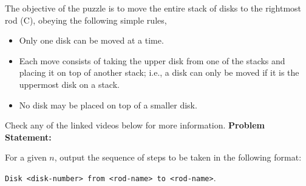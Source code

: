 The objective of the puzzle is to move the entire stack of disks to the
rightmost rod (C), obeying the following simple rules,
\begin{itemize}
	\item Only one disk can be moved at a time.
	\item Each move consists of taking the upper disk from one of the stacks and placing it on top of another stack; i.e., a disk can only be moved if it is the uppermost disk on a stack.
	\item No disk may be placed on top of a smaller disk.
\end{itemize}
Check any of the linked videos below for more information.
\textbf{Problem Statement:}

For a given $n$, output the sequence of steps to be taken in the following format:

\verb!Disk <disk-number> from <rod-name> to <rod-name>!.

